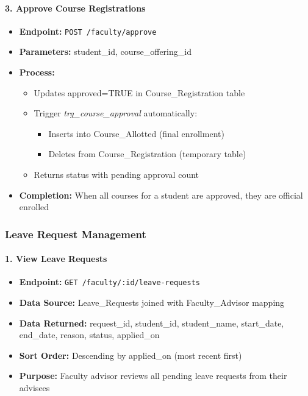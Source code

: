 \documentclass[12pt]{article}
\begin{document}
\paragraph{3. Approve Course Registrations}
\begin{itemize}
    \item \textbf{Endpoint:} \texttt{POST /faculty/approve}
    \item \textbf{Parameters:} student\_id, course\_offering\_id
    \item \textbf{Process:}
        \begin{itemize}
            \item Updates approved=TRUE in Course\_Registration table
            \item Trigger \textit{trg\_course\_approval} automatically:
                \begin{itemize}
                    \item Inserts into Course\_Allotted (final enrollment)
                    \item Deletes from Course\_Registration (temporary table)
                \end{itemize}
            \item Returns status with pending approval count
        \end{itemize}
    \item \textbf{Completion:} When all courses for a student are approved, they are official enrolled
\end{itemize}

\subsubsection{Leave Request Management}

\paragraph{1. View Leave Requests}
\begin{itemize}
    \item \textbf{Endpoint:} \texttt{GET /faculty/:id/leave-requests}
    \item \textbf{Data Source:} Leave\_Requests joined with Faculty\_Advisor mapping
    \item \textbf{Data Returned:} request\_id, student\_id, student\_name, start\_date, end\_date, reason, status, applied\_on
    \item \textbf{Sort Order:} Descending by applied\_on (most recent first)
    \item \textbf{Purpose:} Faculty advisor reviews all pending leave requests from their advisees
\end{itemize}
\end{document}
